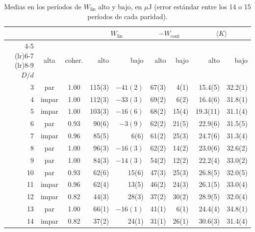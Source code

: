 \documentclass[11pt,a4paper]{article}
\newcommand{\ave}[1]{\langle #1 \rangle}
\newcommand{\Wlin}{W_\text{lin}}
\newcommand{\Wcont}{W_\text{cont}}
\begin{document}
\begin{table}[ht]
\centering
\small
\caption{Medias en los períodos de $\Wlin$ alto y bajo, en $\mu$J
  (error estándar entre los 14 o 15 períodos de cada paridad).}
\label{tab:paridad}
\begin{tabular}{rcc rr rr rr}
  \toprule
  & & & \multicolumn{2}{c}{$\Wlin$} & \multicolumn{2}{c}{$-\Wcont$} &
    \multicolumn{2}{c}{$\ave{K}$} \\
  \cmidrule(lr){4-5} \cmidrule(lr){6-7} \cmidrule(lr){8-9}
  $D/d$ & alta & coher. & alto & bajo & alto & bajo & alto & bajo \\
  \midrule
  3 & par & 1.00 & 115(3) & $-41(2)$ & 67(3) & 4(1) & 15.4(5) & 32.2(1) \\
  4 & impar & 1.00 & 112(3) & $-33(3)$ & 69(2) & 6(2) & 16.4(6) & 31.8(1) \\
  5 & impar & 1.00 & 103(3) & $-16(6)$ & 68(2) & 15(4) & 19.3(11) & 31.1(4) \\
  6 & par & 0.93 & 90(6) & $-3(9)$ & 62(2) & 21(5) & 22.9(6) & 31.5(5) \\
  7 & impar & 0.96 & 85(5) & 6(6) & 61(2) & 25(3) & 24.7(6) & 31.3(4) \\
  8 & par & 1.00 & 96(3) & $-16(3)$ & 62(2) & 14(2) & 23.0(6) & 32.6(2) \\
  9 & par & 1.00 & 84(3) & $-14(3)$ & 54(2) & 12(2) & 22.2(4) & 33.0(2) \\
  10 & par & 0.93 & 62(6) & 15(6) & 47(3) & 25(3) & 26.8(5) & 32.0(5) \\
  11 & impar & 0.96 & 62(4) & 13(5) & 46(2) & 24(3) & 26.1(5) & 33.0(4) \\
  12 & impar & 0.82 & 44(3) & 28(3) & 37(2) & 30(2) & 28.9(5) & 32.0(4) \\
  13 & par & 1.00 & 66(1) & $-16(1)$ & 41(1) & 6(1) & 24.4(4) & 34.8(1) \\
  14 & impar & 0.82 & 37(2) & 24(1) & 31(1) & 26(1) & 30.6(3) & 31.4(4) \\
  \bottomrule
\end{tabular}
\end{table}
\end{document}
